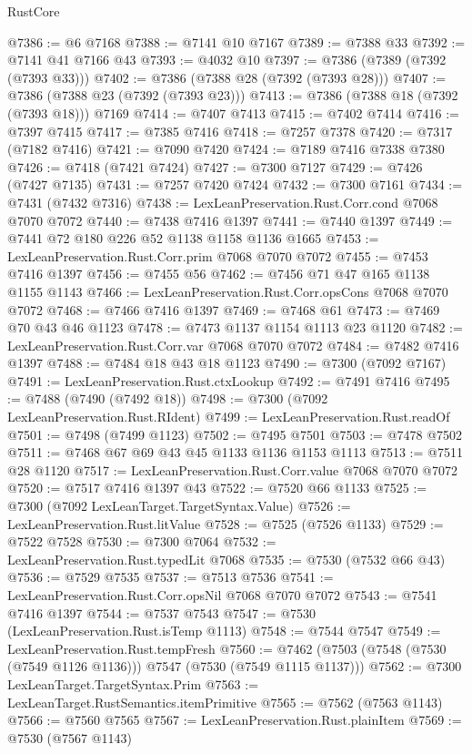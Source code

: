 \begin{lexlean}{RustCore}
\begin{coremodule}
@7386 := @6 @7168
@7388 := @7141 @10 @7167
@7389 := @7388 @33
@7392 := @7141 @41 @7166 @43
@7393 := @4032 @10
@7397 := @7386 (@7389 (@7392 (@7393 @33)))
@7402 := @7386 (@7388 @28 (@7392 (@7393 @28)))
@7407 := @7386 (@7388 @23 (@7392 (@7393 @23)))
@7413 := @7386 (@7388 @18 (@7392 (@7393 @18))) @7169
@7414 := @7407 @7413
@7415 := @7402 @7414
@7416 := @7397 @7415
@7417 := @7385 @7416
@7418 := @7257 @7378
@7420 := @7317 (@7182 @7416)
@7421 := @7090 @7420
@7424 := @7189 @7416 @7338 @7380
@7426 := @7418 (@7421 @7424)
@7427 := @7300 @7127
@7429 := @7426 (@7427 @7135)
@7431 := @7257 @7420 @7424
@7432 := @7300 @7161
@7434 := @7431 (@7432 @7316)
@7438 := LexLeanPreservation.Rust.Corr.cond @7068 @7070 @7072
@7440 := @7438 @7416 @1397
@7441 := @7440 @1397
@7449 := @7441 @72 @180 @226 @52 @1138 @1158 @1136 @1665
@7453 := LexLeanPreservation.Rust.Corr.prim @7068 @7070 @7072
@7455 := @7453 @7416 @1397
@7456 := @7455 @56
@7462 := @7456 @71 @47 @165 @1138 @1155 @1143
@7466 := LexLeanPreservation.Rust.Corr.opsCons @7068 @7070 @7072
@7468 := @7466 @7416 @1397
@7469 := @7468 @61
@7473 := @7469 @70 @43 @46 @1123
@7478 := @7473 @1137 @1154 @1113 @23 @1120
@7482 := LexLeanPreservation.Rust.Corr.var @7068 @7070 @7072
@7484 := @7482 @7416 @1397
@7488 := @7484 @18 @43 @18 @1123
@7490 := @7300 (@7092 @7167)
@7491 := LexLeanPreservation.Rust.ctxLookup
@7492 := @7491 @7416
@7495 := @7488 (@7490 (@7492 @18))
@7498 := @7300 (@7092 LexLeanPreservation.Rust.RIdent)
@7499 := LexLeanPreservation.Rust.readOf
@7501 := @7498 (@7499 @1123)
@7502 := @7495 @7501
@7503 := @7478 @7502
@7511 := @7468 @67 @69 @43 @45 @1133 @1136 @1153 @1113
@7513 := @7511 @28 @1120
@7517 := LexLeanPreservation.Rust.Corr.value @7068 @7070 @7072
@7520 := @7517 @7416 @1397 @43
@7522 := @7520 @66 @1133
@7525 := @7300 (@7092 LexLeanTarget.TargetSyntax.Value)
@7526 := LexLeanPreservation.Rust.litValue
@7528 := @7525 (@7526 @1133)
@7529 := @7522 @7528
@7530 := @7300 @7064
@7532 := LexLeanPreservation.Rust.typedLit @7068
@7535 := @7530 (@7532 @66 @43)
@7536 := @7529 @7535
@7537 := @7513 @7536
@7541 := LexLeanPreservation.Rust.Corr.opsNil @7068 @7070 @7072
@7543 := @7541 @7416 @1397
@7544 := @7537 @7543
@7547 := @7530 (LexLeanPreservation.Rust.isTemp @1113)
@7548 := @7544 @7547
@7549 := LexLeanPreservation.Rust.tempFresh
@7560 := @7462 (@7503 (@7548 (@7530 (@7549 @1126 @1136))) @7547 (@7530 (@7549 @1115 @1137)))
@7562 := @7300 LexLeanTarget.TargetSyntax.Prim
@7563 := LexLeanTarget.RustSemantics.itemPrimitive
@7565 := @7562 (@7563 @1143)
@7566 := @7560 @7565
@7567 := LexLeanPreservation.Rust.plainItem
@7569 := @7530 (@7567 @1143)

\end{coremodule}
\end{lexlean}
